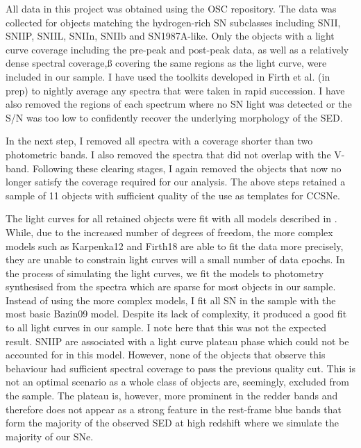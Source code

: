 All data in this project was obtained using the OSC repository. The data was collected for objects matching the hydrogen-rich SN subclasses including SNII, SNIIP, SNIIL, SNIIn, SNIIb and SN1987A-like. Only the objects with a light curve coverage including the pre-peak and post-peak data, as well as a relatively dense spectral coverage,ß        covering the same regions as the light curve, were included in our sample. I have used the toolkits developed in Firth et al. (in prep) to nightly average any spectra that were taken in rapid succession. I have also removed the regions of each spectrum where no SN light was detected or the S/N was too low to confidently recover the underlying morphology of the SED.

In the next step, I removed all spectra with a coverage shorter than two photometric bands. I also removed the spectra that did not overlap with the V-band. Following these clearing stages, I again removed the objects that now no longer satisfy the coverage required for our analysis. The above steps retained a sample of 11 objects with sufficient quality of the use as templates for CCSNe.

The light curves for all retained objects were fit with all models described in . While, due to the increased number of degrees of freedom, the more complex models such as Karpenka12 and Firth18 are able to fit the data more precisely, they are unable to constrain light curves will a small number of data epochs. In the process of simulating the light curves, we fit the models to photometry synthesised from the spectra which are sparse for most objects in our sample. Instead of using the more complex models, I fit all SN in the sample with the most basic Bazin09 model. Despite its lack of complexity, it produced a good fit to all light curves in our sample. I note here that this was not the expected result. SNIIP are associated with a light curve plateau phase which could not be accounted for in this model. However, none of the objects that observe this behaviour had sufficient spectral coverage to pass the previous quality cut. This is not an optimal scenario as a whole class of objects are, seemingly, excluded from the sample. The plateau is, however, more prominent in the redder bands and therefore does not appear as a strong feature in the rest-frame blue bands that form the majority of the observed SED at high redshift where we simulate the majority of our SNe.

